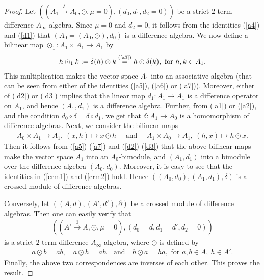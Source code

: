 \documentclass[a4paper,reqno,10pt]{amsart}
\theoremstyle{plain}
\theoremstyle{definition}
\theoremstyle{remark}
\begin{document}
\begin{proof}
    Let $(( A_1 \xrightarrow{\delta} A_0, \odot, \mu= 0) , (d_0, d_1, d_2 = 0) )$ be a strict $2$-term difference $A_\infty$-algebra. Since $\mu = 0$ and $d_2 = 0$, it follows from the identities (\ref{a4}) and (\ref{d1}) that $(A_0 = (A_0, \odot), d_0 )$ is a difference algebra. We now define a bilinear map $\odot_1 : A_1 \times A_1 \rightarrow A_1$ by 
    \begin{align*}
        h \odot_1 k := \delta (h) \odot k \stackrel{\text{(\ref{a3})} }{=} h \odot \delta (k), \text{ for } h , k \in A_1.
    \end{align*}
    This multiplication makes the vector space $A_1$ into an associative algebra (that can be seen from either of the identities (\ref{a5}), (\ref{a6}) or (\ref{a7})). Moreover, either of (\ref{d2}) or (\ref{d3}) implies that the linear map $d_1: A_1 \rightarrow A_1$ is a difference operator on $A_1$, and hence $(A_1, d_1)$ is a difference algebra. Further, from (\ref{a1}) or (\ref{a2}), and the condition $d_0 \circ \delta = \delta \circ d_1$, we get that $\delta: A_1 \rightarrow A_0$ is a homomorphism of difference algebras. Next, we consider the bilinear maps
    \begin{align*}
        A_0 \times A_1 \rightarrow A_1, ~ (x, h) \mapsto x \odot h \quad \text{ and } \quad A_1 \times A_0 \rightarrow A_1, ~ (h , x) \mapsto h \odot x.
    \end{align*}
    Then it follows from (\ref{a5})-(\ref{a7}) and (\ref{d2})-(\ref{d3}) that the above bilinear maps make the vector space $A_1$ into an $A_0$-bimodule, and $(A_1, d_1)$ into a bimodule over the difference algebra $(A_0, d_0)$. Moreover, it is easy to see that the identities in (\ref{crm1}) and (\ref{crm2}) hold. Hence $((A_0, d_0 ), (A_1, d_1), \delta )$ is a crossed module of difference algebras.

    \medskip

    Conversely, let $((A, d), (A', d'), \partial)$ be a crossed module of difference algebras. Then one can easily verify that
    \begin{align*}
        ((A' \xrightarrow{\partial} A, \odot, \mu= 0 ) , (d_0 = d, d_1 = d', d_2 = 0) )
    \end{align*}
    is a strict $2$-term difference $A_\infty$-algebra, where $\odot$ is defined by
    \begin{align*}
        a \odot b = a b, \quad a \odot h = a h ~~~ \text{ and } ~~~ h \odot a = h a, \text{ for } a, b \in A, ~ \! h \in A'.
    \end{align*}
    Finally, the above two correspondences are inverses of each other. This proves the result.
\end{proof}
\end{document}
